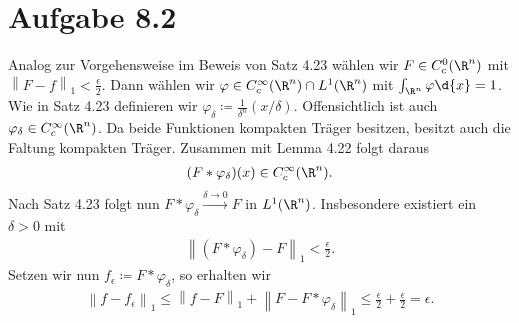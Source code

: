 \documentclass{article}
\newcommand{\norm}[1]{\left\lVert #1 \right\rVert}
\begin{document}
    \section*{Aufgabe 8.2}
    Analog zur Vorgehensweise im Beweis von Satz 4.23 wählen wir $F \in C^0_c(\R^n)$ mit $\norm{F - f}_1 <\frac{\epsilon}{2}$.
    Dann wählen wir $\varphi \in C_c^\infty (\R^n)\cap L^1(\R^n)$ mit $\int_{\R^n} \varphi \d{x} = 1$. Wie in Satz 4.23 definieren wir $\varphi_\delta \coloneqq \frac{1}{\delta^n}(x/\delta)$. Offensichtlich ist auch $\varphi_\delta \in C_c^\infty(\R^n)$.
    Da beide Funktionen kompakten Träger besitzen, besitzt auch die Faltung kompakten Träger. Zusammen mit Lemma 4.22 folgt daraus
    \begin{align*}
        (F * \varphi_\delta)(x) \in C_c^\infty(\R^n).
    \end{align*}
    Nach Satz 4.23 folgt nun $F * \varphi_\delta \xrightarrow{\delta \to 0} F$ in $L^1(\R^n)$. 
    Insbesondere existiert ein $\delta > 0$ mit
    \begin{align*}
        \norm{(F * \varphi_\delta) - F}_1 < \frac{\epsilon}{2}.
    \end{align*}
    Setzen wir nun $f_\epsilon \coloneqq F * \varphi_\delta$, so erhalten wir
    \begin{align*}
        \norm{f - f_\epsilon}_1 \leq \norm{f - F}_1 + \norm{F - F * \varphi_\delta}_1 \leq \frac{\epsilon}{2} + \frac{\epsilon}{2} = \epsilon.
    \end{align*}
\end{document}
